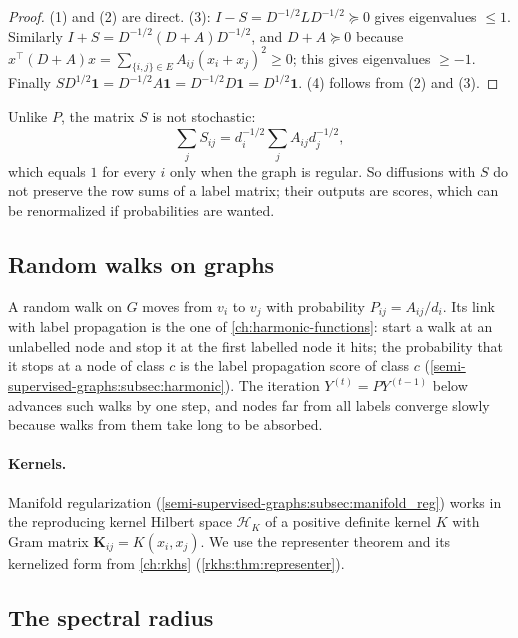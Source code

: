 \begin{notechapter}
\begin{proof}
(1) and (2) are direct. (3): $I - S = D^{-1/2}LD^{-1/2} \succeq 0$ gives eigenvalues $\le 1$. Similarly $I + S = D^{-1/2}(D + A)D^{-1/2}$, and $D + A \succeq 0$ because $x^\top(D + A)x = \sum_{\{i,j\}\in E}A_{ij}(x_i + x_j)^2 \ge 0$; this gives eigenvalues $\ge -1$. Finally $SD^{1/2}\mathbf 1 = D^{-1/2}A\mathbf 1 = D^{-1/2}D\mathbf 1 = D^{1/2}\mathbf 1$. (4) follows from (2) and (3).
\end{proof}

\begin{remark}
\label{semi-supervised-graphs:rem:row_sums}
Unlike $P$, the matrix $S$ is not stochastic:
\[
\sum_jS_{ij} = d_i^{-1/2}\sum_jA_{ij}d_j^{-1/2},
\]
which equals $1$ for every $i$ only when the graph is regular. So diffusions with $S$ do not preserve the row sums of a label matrix; their outputs are scores, which can be renormalized if probabilities are wanted.
\end{remark}

\subsection{Random walks on graphs}
\label{semi-supervised-graphs:subsec:random_walks}

A random walk on $G$ moves from $v_i$ to $v_j$ with probability $P_{ij} = A_{ij}/d_i$. Its link with label propagation is the one of \cref{ch:harmonic-functions}: start a walk at an unlabelled node and stop it at the first labelled node it hits; the probability that it stops at a node of class $c$ is the label propagation score of class $c$ (\cref{semi-supervised-graphs:subsec:harmonic}). The iteration $Y^{(t)} = PY^{(t-1)}$ below advances such walks by one step, and nodes far from all labels converge slowly because walks from them take long to be absorbed.

\paragraph{Kernels.} Manifold regularization (\cref{semi-supervised-graphs:subsec:manifold_reg}) works in the reproducing kernel Hilbert space $\mathcal H_K$ of a positive definite kernel $K$ with Gram matrix $\mathbf K_{ij} = K(x_i, x_j)$. We use the representer theorem and its kernelized form from \cref{ch:rkhs} (\cref{rkhs:thm:representer}).

\subsection{The spectral radius}
\label{semi-supervised-graphs:subsec:spectral_radius}


\end{notechapter}
